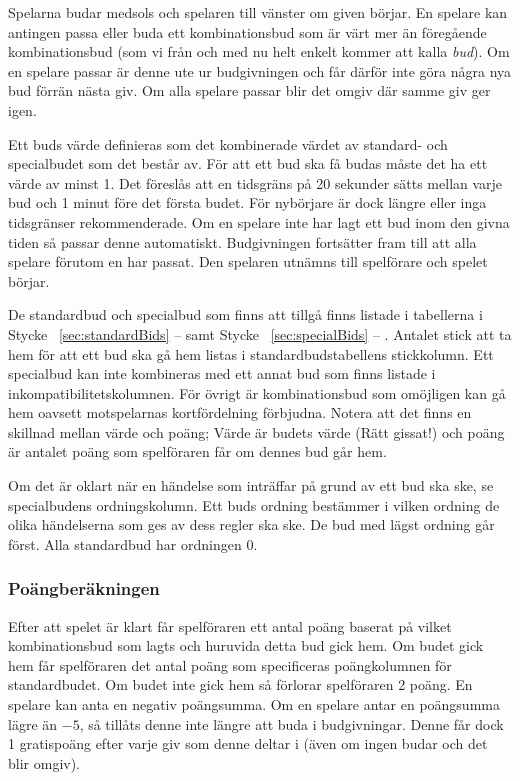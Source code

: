\documentclass[a4paper]{article}
\renewcommand{\sectionref}[1]{%
	\ref{sec:#1} -- \nameref{sec:#1}%
}
\begin{document}
				Spelarna budar medsols och spelaren till vänster om given börjar. En spelare kan antingen passa eller buda ett kombinationsbud som är värt mer än föregående kombinationsbud (som vi från och med nu helt enkelt kommer att kalla \emph{bud}). Om en spelare passar är denne ute ur budgivningen och får därför inte göra några nya bud förrän nästa giv. Om alla spelare passar blir det omgiv där samme giv ger igen.

				Ett buds värde definieras som det kombinerade värdet av standard- och specialbudet som det består av. För att ett bud ska få budas måste det ha ett värde av minst 1. Det föreslås att en tidsgräns på 20 sekunder sätts mellan varje bud och 1 minut före det första budet. För nybörjare är dock längre eller inga tidsgränser rekommenderade. Om en spelare inte har lagt ett bud inom den givna tiden så passar denne automatiskt. Budgivningen fortsätter fram till att alla spelare förutom en har passat. Den spelaren utnämns till spelförare och spelet börjar.

				De standardbud och specialbud som finns att tillgå finns listade i tabellerna i Stycke~\sectionref{standardBids} samt Stycke~\sectionref{specialBids}. Antalet stick att ta hem för att ett bud ska gå hem listas i standardbudstabellens stickkolumn. Ett specialbud kan inte kombineras med ett annat bud som finns listade i inkompatibilitetskolumnen. För övrigt är kombinationsbud som omöjligen kan gå hem oavsett motspelarnas kortfördelning förbjudna. Notera att det finns en skillnad mellan värde och poäng; Värde är budets värde (Rätt gissat!) och poäng är antalet poäng som spelföraren får om dennes bud går hem.

				Om det är oklart när en händelse som inträffar på grund av ett bud ska ske, se specialbudens ordningskolumn. Ett buds ordning bestämmer i vilken ordning de olika händelserna som ges av dess regler ska ske. De bud med lägst ordning går först. Alla standardbud har ordningen 0.

			\subsubsection{Poängberäkningen}
				Efter att spelet är klart får spelföraren ett antal poäng baserat på vilket kombinationsbud som lagts och huruvida detta bud gick hem. Om budet gick hem får spelföraren det antal poäng som specificeras poängkolumnen för standardbudet. Om budet inte gick hem så förlorar spelföraren 2 poäng. En spelare kan anta en negativ poängsumma. Om en spelare antar en poängsumma lägre än $-5$, så tillåts denne inte längre att buda i budgivningar. Denne får dock 1 gratispoäng efter varje giv som denne deltar i (även om ingen budar och det blir omgiv).
\end{document}

